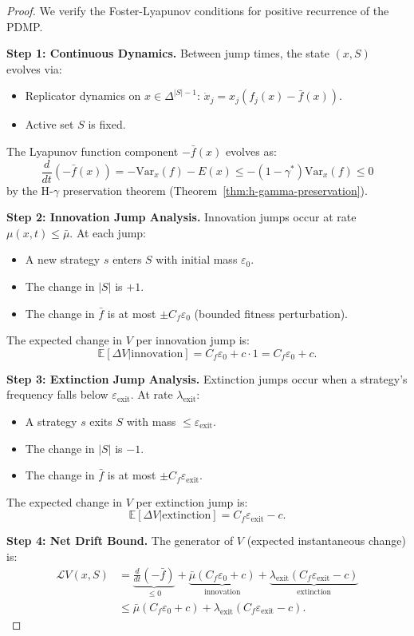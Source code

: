 \documentclass[12pt]{article}
\newcommand{\E}{\mathbb{E}}
\newcommand{\Var}{\mathrm{Var}}
\begin{document}
\begin{proof}
We verify the Foster-Lyapunov conditions for positive recurrence of the PDMP.

\textbf{Step 1: Continuous Dynamics.}
Between jump times, the state $(x, S)$ evolves via:
\begin{itemize}
    \item Replicator dynamics on $x \in \Delta^{|S|-1}$: $\dot{x}_j = x_j(f_j(x) - \bar{f}(x))$.
    \item Active set $S$ is fixed.
\end{itemize}
The Lyapunov function component $-\bar{f}(x)$ evolves as:
\[
\frac{d}{dt}(-\bar{f}(x)) = -\Var_x(f) - E(x) \leq -(1 - \gamma^*) \Var_x(f) \leq 0
\]
by the H-$\gamma$ preservation theorem (Theorem~\ref{thm:h-gamma-preservation}).

\textbf{Step 2: Innovation Jump Analysis.}
Innovation jumps occur at rate $\mu(x, t) \leq \bar{\mu}$. At each jump:
\begin{itemize}
    \item A new strategy $s$ enters $S$ with initial mass $\varepsilon_0$.
    \item The change in $|S|$ is $+1$.
    \item The change in $\bar{f}$ is at most $\pm C_f \varepsilon_0$ (bounded fitness perturbation).
\end{itemize}
The expected change in $V$ per innovation jump is:
\[
\E[\Delta V | \text{innovation}] = C_f \varepsilon_0 + c \cdot 1 = C_f \varepsilon_0 + c.
\]

\textbf{Step 3: Extinction Jump Analysis.}
Extinction jumps occur when a strategy's frequency falls below $\varepsilon_{\text{exit}}$. At rate $\lambda_{\text{exit}}$:
\begin{itemize}
    \item A strategy $s$ exits $S$ with mass $\leq \varepsilon_{\text{exit}}$.
    \item The change in $|S|$ is $-1$.
    \item The change in $\bar{f}$ is at most $\pm C_f \varepsilon_{\text{exit}}$.
\end{itemize}
The expected change in $V$ per extinction jump is:
\[
\E[\Delta V | \text{extinction}] = C_f \varepsilon_{\text{exit}} - c.
\]

\textbf{Step 4: Net Drift Bound.}
The generator of $V$ (expected instantaneous change) is:
\begin{align*}
\mathcal{L} V(x, S) &= \underbrace{\frac{d}{dt}(-\bar{f})}_{\leq 0} + \underbrace{\bar{\mu}(C_f \varepsilon_0 + c)}_{\text{innovation}} + \underbrace{\lambda_{\text{exit}}(C_f \varepsilon_{\text{exit}} - c)}_{\text{extinction}} \\
&\leq \bar{\mu}(C_f \varepsilon_0 + c) + \lambda_{\text{exit}}(C_f \varepsilon_{\text{exit}} - c).
\end{align*}


\end{proof}
\end{document}
